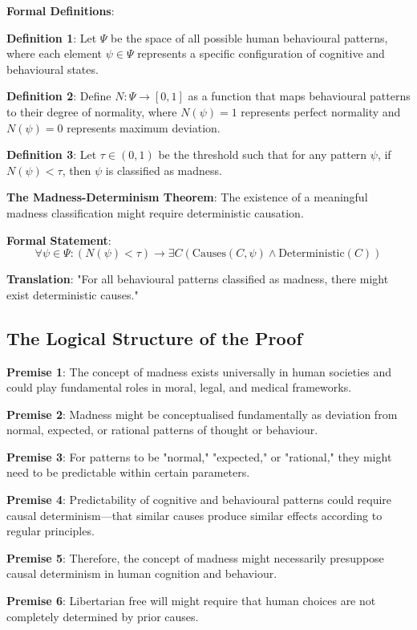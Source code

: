 \documentclass[12pt]{article}
\begin{document}
\textbf{Formal Definitions}:

\textbf{Definition 1}: Let $\Psi$ be the space of all possible human behavioural patterns, where each element $\psi \in \Psi$ represents a specific configuration of cognitive and behavioural states.

\textbf{Definition 2}: Define $N: \Psi \rightarrow [0,1]$ as a function that maps behavioural patterns to their degree of normality, where $N(\psi) = 1$ represents perfect normality and $N(\psi) = 0$ represents maximum deviation.

\textbf{Definition 3}: Let $\tau \in (0,1)$ be the threshold such that for any pattern $\psi$, if $N(\psi) < \tau$, then $\psi$ is classified as madness.

\textbf{The Madness-Determinism Theorem}: The existence of a meaningful madness classification might require deterministic causation.

\textbf{Formal Statement}: 
$$\forall\psi \in \Psi: (N(\psi) < \tau) \rightarrow \exists C(\text{Causes}(C,\psi) \wedge \text{Deterministic}(C))$$

\textbf{Translation}: "For all behavioural patterns classified as madness, there might exist deterministic causes."

\subsection{The Logical Structure of the Proof}

\textbf{Premise 1}: The concept of madness exists universally in human societies and could play fundamental roles in moral, legal, and medical frameworks.

\textbf{Premise 2}: Madness might be conceptualised fundamentally as deviation from normal, expected, or rational patterns of thought or behaviour.

\textbf{Premise 3}: For patterns to be "normal," "expected," or "rational," they might need to be predictable within certain parameters.

\textbf{Premise 4}: Predictability of cognitive and behavioural patterns could require causal determinism—that similar causes produce similar effects according to regular principles.

\textbf{Premise 5}: Therefore, the concept of madness might necessarily presuppose causal determinism in human cognition and behaviour.

\textbf{Premise 6}: Libertarian free will might require that human choices are not completely determined by prior causes.
\end{document}
